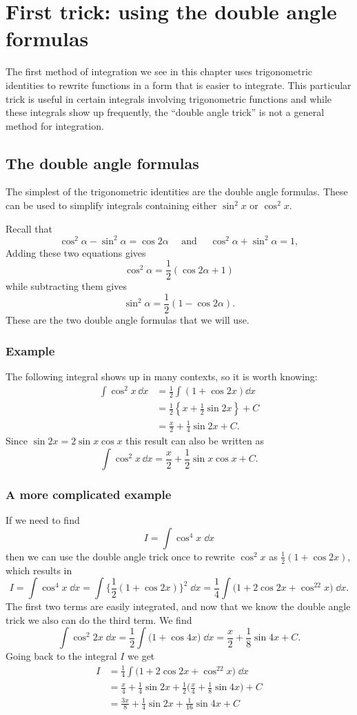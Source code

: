 \section{First trick: using the double angle formulas} %
\label{sec:01double-angle-trick}
The first method of integration we see in this chapter uses trigonometric
identities to rewrite functions in a form that is easier to integrate.  This
particular trick is useful in certain integrals involving trigonometric
functions and while these integrals show up frequently, the ``double angle
trick'' is not a general method for integration.

\subsection{The double angle formulas} %
The simplest of the trigonometric identities are the double angle formulas.
These can be used to simplify integrals containing either $\sin^2 x$ or $\cos^2
x$.

Recall that
\[
\cos^2 \alpha-\sin^2\alpha = \cos 2\alpha \quad\text{ and }\quad \cos^2\alpha +
\sin^2\alpha =1,
\]
Adding these two equations gives
\[
\cos^2 \alpha =\frac12\left(\cos2\alpha+1\right)
\]
while subtracting them gives
\[
\sin^2 \alpha = \frac 12 \left(1-\cos2\alpha\right).
\]
These are the two double angle formulas that we will use.

\subsubsection{Example} The following integral shows up in many contexts, so it
is worth knowing:
\begin{align*}
  \int \cos^2 x\,\dd x
  &= \frac12 \int (1+\cos 2x)\dd x\\
  &= \frac12 \left\{x+\frac 12 \sin 2x\right\} +C\\
  &=\frac x2 +\frac 14 \sin 2x + C.
\end{align*}
Since $\sin2x=2\sin x\cos x$ this result can also be written as
\[
\int \cos^2 x\,\dd x = \frac x2+\frac12 \sin x\cos x +C.
\]
\subsubsection{A more complicated example} If we need to find
\[
I=\int \cos^4x \; \dd x
\]
then we can use the double angle trick once to rewrite $\cos^2 x$ as
$\frac12(1+\cos 2x)$, which results in
\[
I=\int \cos^4x \; \dd x =\int\bigl\{\frac12(1+\cos 2x)\bigr\}^2 \;\dd x =\frac14
\int \bigl(1+2\cos 2x + \cos^22x\bigr)\; \dd x.
\]
The first two terms are easily integrated, and now that we know the double angle
trick we also can do the third term.  We find
\[
\int\cos^2 2x\;\dd x = \frac12 \int \bigl(1+\cos 4x\bigr)\;\dd x = \frac x2 +
\frac18\sin 4x +C.
\]
Going back to the integral $I$ we get
\begin{align*}
  I
  &= \frac14 \int \bigl(1+2\cos 2x + \cos^22x\bigr)\; \dd x\\
  &= \frac x4 + \frac14\sin 2x +\frac12 \bigl( \frac x4 + \frac 18\sin 4x\bigr) +C\\
  &= \frac {3x}8 + \frac14\sin 2x + \frac 1{16}\sin 4x +C
\end{align*}

